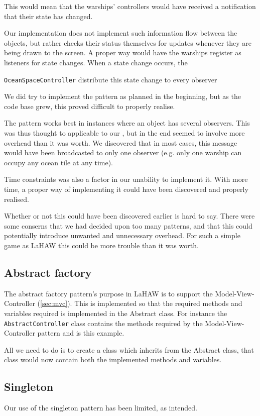 This would mean that the warships' controllers would have received a notification that their state has changed.

Our implementation does not implement such information flow between the objects, but rather checks their status themselves for updates whenever they are being drawn to the screen.
A proper way would have the warships register as listeners for state changes. When a state change occurs, the 

\texttt{OceanSpaceController} distribute this state change to every observer

We did try to implement the pattern as planned in the beginning, but as the code base grew, this proved difficult to properly realise.

The pattern works best in instances where an object has several observers. This was thus thought to applicable to our 
, but in the end seemed to involve more overhead than it was worth. We discovered that in most cases, this message would have been broadcasted to only one observer (e.g. only one warship can occupy any ocean tile at any time).

Time constraints was also a factor in our unability to implement it. With more time, a proper way of implementing it could have been discovered and properly realised.

Whether or not this could have been discovered earlier is hard to say. There were some conserns that we had decided upon too many patterns, and that this could potentially introduce unwanted and unnecessary overhead. For such a simple game as LaHAW this could be more trouble than it was worth.



\subsection{Abstract factory}
\label{sec:absfac}
The abstract factory pattern's purpose in LaHAW is to support the Model-View-Controller (\ref{sec:mvc}). This is implemented so that the required methods and variables required is implemented in the Abstract class. 
For instance the \texttt{AbstractController} class contains the methods required by the Model-View-Controller pattern and is this example. %

All we need to do is to create a class which inherits from the Abstract class, that class would now contain both the implemented methods and variables.

\subsection{Singleton}
Our use of the singleton pattern has been limited, as intended.

